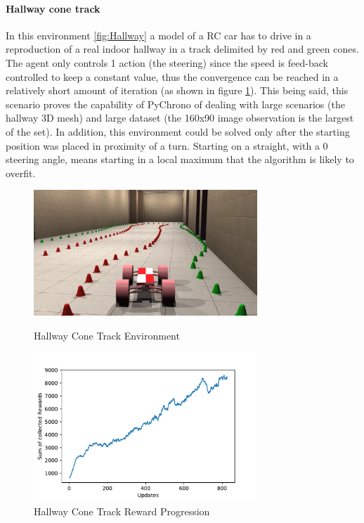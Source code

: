 \documentclass{svproc}
\begin{document}
\paragraph{Hallway cone track}
In this environment \ref{fig:Hallway} a model of a RC car has to drive in a reproduction of a real indoor hallway in a track delimited by red and green cones. The agent only controls 1 action (the steering) since the speed is feed-back controlled to keep a constant value, thus the convergence can be reached in a relatively short amount of iteration (as shown in figure \ref{fig:Hallway_rew}). This being said, this scenario proves the capability of PyChrono of dealing with large scenarios (the hallway 3D mesh) and large dataset (the 160x90 image observation is the largest of the set). In addition, this environment could be solved only after the starting position was placed in proximity of a turn. Starting on a straight, with a 0 steering angle, means starting in a local maximum that the algorithm is likely to overfit. 

\begin{figure}[ht]
 \begin{minipage}[b]{0.6\linewidth}
    \centering
    \includegraphics[width=0.75\textwidth]{Figures/hallway.png}
    \caption{Hallway Cone Track Environment}
    \label{fig:Hallway}
 \end{minipage}
 \begin{minipage}[b]{0.6\linewidth}
    \centering
    \includegraphics[width=0.75\textwidth]{Figures/hallway_rewards.pdf}
    \caption{Hallway Cone Track Reward Progression}
    \label{fig:Hallway_rew}
 \end{minipage}
\end{figure}
\end{document}
